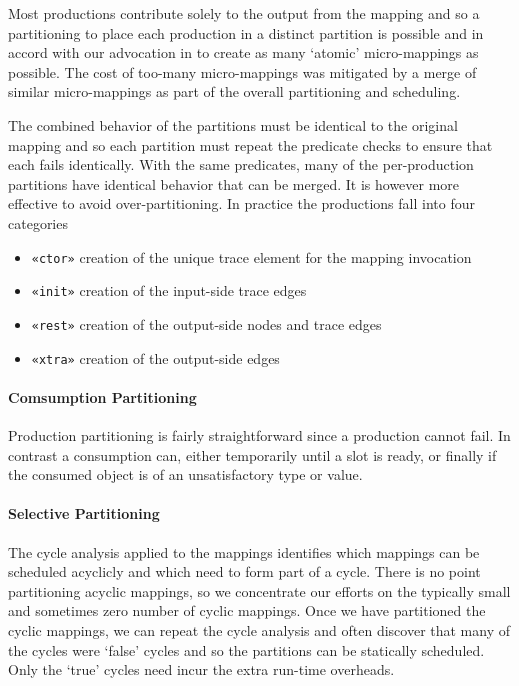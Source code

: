 \documentclass{jot}
\begin{document}
Most productions contribute solely to the output from the mapping and so a partitioning to place each production in a distinct partition is possible and in accord with our advocation in \cite{Willink-EXE2016} to create as many `atomic' micro-mappings as possible. The cost of too-many micro-mappings was mitigated by a merge of similar micro-mappings as part of the overall partitioning and scheduling. 

The combined behavior of the partitions must  be identical to the original mapping and so each partition must repeat the predicate checks to ensure that each fails identically. With the same predicates, many of the per-production partitions have identical behavior that can be merged. It is however more effective to avoid over-partitioning. In practice the productions fall into four categories

\begin{itemize}
	\item \verb|«ctor»| creation of the unique trace element for the mapping invocation
	\item \verb|«init»| creation of the input-side trace edges
	\item \verb|«rest»| creation of the output-side nodes and trace edges
	\item \verb|«xtra»| creation of the output-side edges	
\end{itemize} 

\paragraph{Comsumption Partitioning}

Production partitioning is fairly straightforward since a production cannot fail. In contrast a consumption can, either temporarily until a slot is ready, or finally if the consumed object is of an unsatisfactory type or value.

\paragraph{Selective Partitioning}

The cycle analysis applied to the mappings identifies which mappings can be scheduled acyclicly and which need to form part of a cycle. There is no point partitioning acyclic mappings, so we concentrate our efforts on the typically small and sometimes zero number of cyclic mappings. Once we have partitioned the cyclic mappings, we can repeat the cycle analysis and often discover that many of the cycles were `false' cycles and so the partitions can be statically scheduled. Only the `true' cycles need incur the extra run-time overheads.
\end{document}
